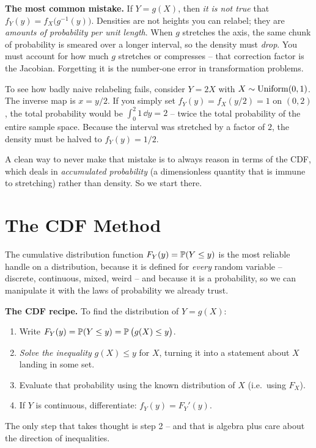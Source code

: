 \begin{trapbox}
\textbf{The most common mistake.} If $Y = g(X)$, then \emph{it is not true} that
$f_Y(y) = f_X\!\big(g^{-1}(y)\big)$. Densities are not heights you can relabel; they
are \emph{amounts of probability per unit length}. When $g$ stretches the axis, the same
chunk of probability is smeared over a longer interval, so the density must \emph{drop}.
You must account for how much $g$ stretches or compresses -- that correction factor is the
Jacobian. Forgetting it is the number-one error in transformation problems.

To see how badly naive relabeling fails, consider $Y = 2X$ with $X \sim \Unif(0,1)$. The
inverse map is $x = y/2$. If you simply set $f_Y(y) = f_X(y/2) = 1$ on $(0,2)$, the total
probability would be $\int_0^2 1\,\dd y = 2$ -- twice the total probability of the entire
sample space. Because the interval was stretched by a factor of $2$, the density must be
halved to $f_Y(y) = 1/2$.
\end{trapbox}

A clean way to never make that mistake is to always reason in terms of the CDF, which
deals in \emph{accumulated probability} (a dimensionless quantity that is immune to
stretching) rather than density. So we start there.

\section{The CDF Method}
\label{ch16:cdf-method}

The cumulative distribution function $F_Y(y) = \P(Y \le y)$ is the most reliable handle on a
distribution, because it is defined for \emph{every} random variable -- discrete,
continuous, mixed, weird -- and because it is a probability, so we can manipulate it
with the laws of probability we already trust.

\begin{focusbox}
\textbf{The CDF recipe.} To find the distribution of $Y = g(X)$:
\begin{enumerate}
  \item Write $F_Y(y) = \P(Y \le y) = \P\big(g(X) \le y\big)$.
  \item \emph{Solve the inequality} $g(X) \le y$ for $X$, turning it into a statement
        about $X$ landing in some set.
  \item Evaluate that probability using the known distribution of $X$ (i.e.\ using
        $F_X$).
  \item If $Y$ is continuous, differentiate: $f_Y(y) = F_Y'(y)$.
\end{enumerate}
The only step that takes thought is step 2 -- and that is algebra plus care about the
direction of inequalities.
\end{focusbox}

